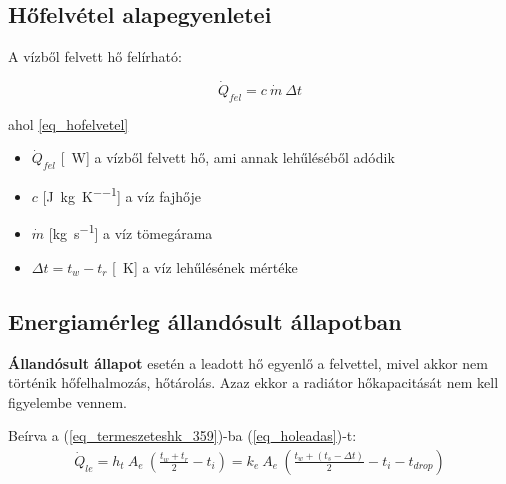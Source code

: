 







%
%
%

\subsection{Hőfelvétel alapegyenletei}
A vízből felvett hő felírható:

\begin{equation} \label{eq_hofelvetel}
\dot Q_{fel} = c ~ \dot{m} ~ \Delta t
\end{equation}

ahol \ref{eq_hofelvetel}

\begin{itemize}[itemsep=6pt,topsep=0pt,parsep=0pt,partopsep=0pt]
	\item[] $\dot{Q}_{fel}$ [\SI{}{\watt}] a vízből felvett hő, ami annak lehűléséből adódik
	\item[] $c$ [\si[per-mode = fraction]{\joule\per\kg\per\kelvin}] a víz fajhője
	\item[] $\dot{m}$ [\si[per-mode = fraction]{\kg\per\second}] a víz tömegárama
	\item[] $\Delta t = t_w-t_r$ [\SI{}{\kelvin}] a víz lehűlésének mértéke
\end{itemize}

\subsection{Energiamérleg állandósult állapotban}
\textbf{Állandósult állapot} esetén a leadott hő egyenlő a felvettel, mivel akkor nem történik hőfelhalmozás, hőtárolás.
Azaz ekkor a radiátor hőkapacitását nem kell figyelembe vennem.

Beírva a (\ref{eq_termeszeteshk_359})-ba (\ref{eq_holeadas})-t:
\begin{equation} \label{eq_holeadas2}
\begin{aligned}
\dot Q_{le} = h_t ~ A_e ~ \left( \frac{t_w+t_r}{2}-t_i\right) = k_e ~ A_e ~ \left( \frac{t_w+(t_s-\Delta t)}{2}-t_i-t_{drop}\right)
\end{aligned}
\end{equation}

